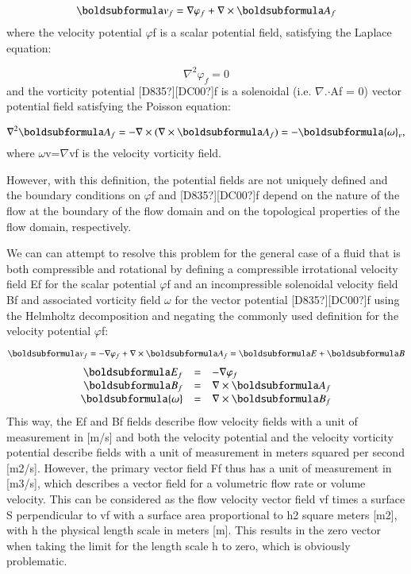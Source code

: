 \documentclass[twoside,final]{article}
\begin{document}
{\begin{equation}
\boldsubformula v_f=\nabla \varphi _f+\nabla \times \boldsubformula A_f
\end{equation}
where the velocity potential $\varphi $f is a scalar potential field, satisfying
the Laplace equation:

\begin{equation}
\nabla ^2\varphi _f=0
\end{equation}
and the vorticity potential [D835?][DC00?]f is a solenoidal (i.e.
${\nabla}$.${\cdot}$Af = 0) vector potential field satisfying the Poisson
equation:

\begin{equation}
\nabla ^2\boldsubformula A_f=-\nabla \times (\nabla \times \boldsubformula A_f)=-\boldsubformula{\omega }_v,
\end{equation}
where $\omega $v=${\nabla}${\texttimes}vf  is the velocity vorticity field.

However, with this definition, the potential fields are not uniquely defined and
the boundary conditions on $\varphi $f and [D835?][DC00?]f depend on the nature
of the flow at the boundary of the flow domain and on the topological properties
of the flow domain, respectively.  

We can can attempt to resolve this problem for the general case of a fluid that
is both compressible and rotational by defining a compressible irrotational
velocity field Ef for the scalar potential $\varphi $f and an incompressible
solenoidal velocity field Bf and associated vorticity field $\omega $ for the
vector potential [D835?][DC00?]f using the Helmholtz decomposition and negating
the commonly used definition for the velocity potential $\varphi $f:

\begin{equation}
\boldsubformula v_f=-\nabla \varphi _f+\nabla \times \boldsubformula A_f=\boldsubformula E+\boldsubformula B
\end{equation}
\begin{equation}
\begin{matrix}\hfill \boldsubformula E_f&=&-\nabla \varphi _f\hfill\null \\\hfill \boldsubformula B_f&=&\nabla \times
\boldsubformula A_f\hfill\null \\\hfill \boldsubformula{\omega }&=&\nabla \times \boldsubformula B_f\hfill\null
\end{matrix}
\end{equation}
This way, the Ef and Bf fields describe flow velocity fields with a unit of
measurement in [m/s] and both the velocity potential and the velocity vorticity
potential describe fields with a unit of measurement in meters squared per
second [m2/s]. However, the primary vector field Ff thus has a unit of
measurement in [m3/s], which describes a vector field for a volumetric flow rate
or volume velocity. This can be considered as the flow velocity vector field vf
times a surface S perpendicular to vf with a surface area proportional to h2
square meters [m2], with h the physical length scale in meters [m]. This results
in the zero vector when taking the limit for the length scale h to zero, which
is obviously problematic.

}
\end{document}
